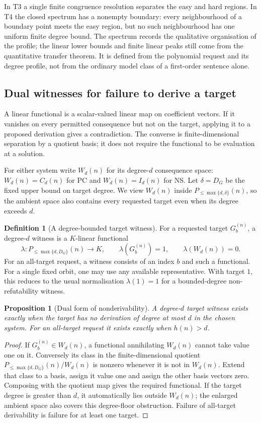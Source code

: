 \documentclass[11pt,a4paper]{article}
\newtheorem{proposition}[theorem]{Proposition}
\theoremstyle{definition}\newtheorem{definition}[theorem]{Definition}
\theoremstyle{remark}\newtheorem{remark}[theorem]{Remark}
\begin{document}
In T3 a single finite congruence resolution separates the easy and
hard regions. In T4 the closed spectrum has a nonempty boundary:
every neighbourhood of a boundary point meets the easy region, but
no such neighbourhood has one uniform finite degree bound.
The spectrum records the qualitative organisation of the profile;
the linear lower bounds and finite linear peaks still come from the
quantitative transfer theorem. It is defined from the polynomial
request and its degree profile, not from the ordinary model class
of a first-order sentence alone.

\subsection{Dual witnesses for failure to derive a target}
A linear functional is a scalar-valued linear map on coefficient
vectors. If it vanishes on every permitted consequence but not on
the target, applying it to a proposed derivation gives a contradiction.
The converse is finite-dimensional separation by a quotient basis;
it does not require the functional to be evaluation at a solution.

For either system write $W_d(n)$ for its degree-$d$ consequence space:
$W_d(n)=C_d(n)$ for PC and $W_d(n)=I_d(n)$ for NS. Let
$\delta=D_G$ be the fixed upper bound on target degree. We view
$W_d(n)$ inside $P_{\le\max\{d,\delta\}}(n)$, so the ambient space
also contains every requested target even when its degree exceeds $d$.

\begin{definition}[A degree-bounded target witness]
\label{def:consistency-witness}
For a requested target $G_b^{(n)}$, a degree-$d$ witness is a $K$-linear
functional
\[
 \lambda:P_{\le\max\{d,D_G\}}(n)\longrightarrow K,\qquad
 \lambda(G_b^{(n)})=1,\qquad\lambda(W_d(n))=0.
\]
For an all-target request, a witness consists of an index $b$ and such
a functional. For a single fixed orbit, one may use any available
representative. With target $1$, this reduces to the usual normalisation
$\lambda(1)=1$ for a bounded-degree non-refutability witness.
\end{definition}

\begin{proposition}[Dual form of nonderivability]
\label{prop:dual-witness}
A degree-$d$ target witness exists exactly when the target has no
derivation of degree at most $d$ in the chosen system. For an all-target
request it exists exactly when $h(n)>d$.
\end{proposition}
\begin{proof}
If $G_b^{(n)}\in W_d(n)$, a functional annihilating $W_d(n)$ cannot
take value one on it. Conversely its class in the finite-dimensional
quotient $P_{\le\max\{d,D_G\}}(n)/W_d(n)$ is nonzero whenever
it is not in $W_d(n)$. Extend that class to a basis, assign it value
one and assign the other basis vectors zero. Composing with the
quotient map gives the required functional. If the target degree is
greater than $d$, it automatically lies outside $W_d(n)$; the enlarged
ambient space also covers this degree-floor obstruction. Failure of
all-target derivability is failure for at least one target.
\end{proof}
\end{document}
